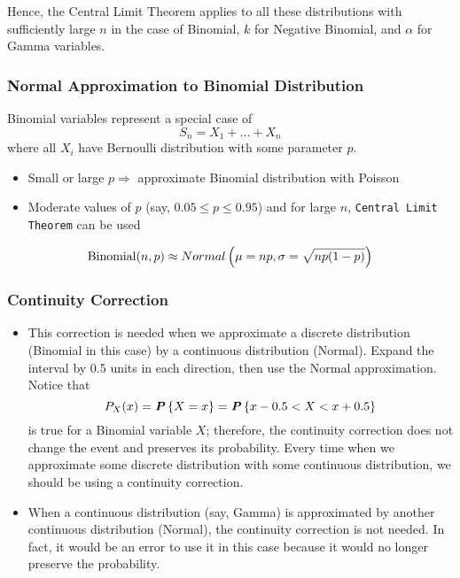 \noindent Hence, the Central Limit Theorem applies to all these distributions with sufficiently large $n$ in the case of Binomial, $k$ for Negative Binomial, and $\alpha$ for Gamma variables.

\begin{multicols}{2}
\setlength{\columnsep}{1.5cm}
\setlength{\columnseprule}{0.2pt}

\subsubsection{Normal Approximation to Binomial Distribution}

Binomial variables represent a special case of
\begin{equation*}
  S_n = X_1 + ... + X_n
\end{equation*}
where all $X_i$ have Bernoulli distribution with some parameter $p$.

\begin{itemize}
  \item Small or large $p \Rightarrow$ approximate Binomial distribution with Poisson
  \item Moderate values of $p$ (say, $0.05 \leq p \leq 0.95$) and for large $n$, \texttt{Central Limit Theorem} can be used
\end{itemize}

\begin{equation*}
    \textnormal{Binomial}(n, p) \approx Normal \left( \mu = np, \sigma = \sqrt{np(1-p)} \right)
\end{equation*}

\subsubsection{Continuity Correction}

\begin{itemize}
  \item This correction is needed when we approximate a discrete distribution (Binomial in this case) by a continuous distribution (Normal). Expand the interval by 0.5 units in each direction, then use the Normal approximation. Notice that
  \begin{equation*}
      P_X(x) = \textbf{\textit{P}}\left\{X = x\right\} = \textbf{\textit{P}}\left\{x - 0.5 < X < x + 0.5\right\}
  \end{equation*}
  is true for a Binomial variable $X$; therefore, the continuity correction does not change the event and preserves its probability. Every time when we approximate some discrete distribution with some continuous distribution, we should be using a continuity correction.

  \item When a continuous distribution (say, Gamma) is approximated by another continuous distribution (Normal), the continuity correction is not needed. In fact, it would be an error to use it in this case because it would no longer preserve the probability.
\end{itemize}

\end{multicols}
